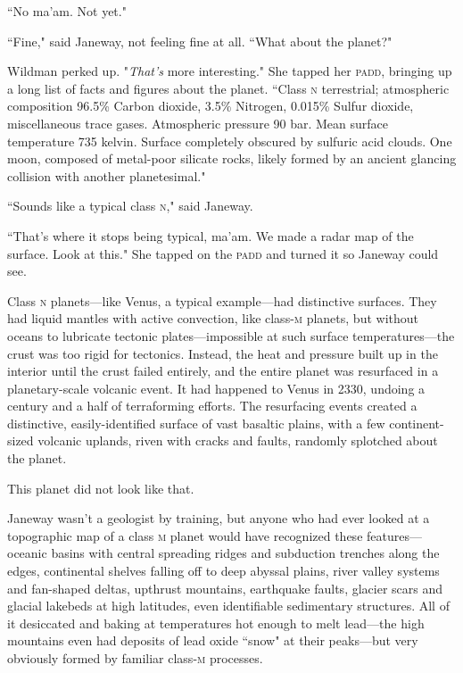 \documentclass[twoside,letterpaper,12pt]{memoir}
\begin{document}
``No ma'am. Not yet."

``Fine," said Janeway, not feeling fine at all. ``What about the planet?"

Wildman perked up. "\textit{That's} more interesting." She tapped her \textsc{padd}, bringing up a long list of facts and figures about the planet. ``Class \textsc{n} terrestrial; atmospheric composition 96.5\% Carbon dioxide, 3.5\% Nitrogen, 0.015\% Sulfur dioxide, miscellaneous trace gases. Atmospheric pressure 90 bar. Mean surface temperature 735 kelvin. Surface completely obscured by sulfuric acid clouds. One moon, composed of metal-poor silicate rocks, likely formed by an ancient glancing collision with another planetesimal."

``Sounds like a typical class \textsc{n}," said Janeway.

``That's where it stops being typical, ma'am. We made a radar map of the surface. Look at this." She tapped on the \textsc{padd} and turned it so Janeway could see.

Class \textsc{n} planets---like Venus, a typical example---had distinctive surfaces. They had liquid mantles with active convection, like class-\textsc{m} planets, but without oceans to lubricate tectonic plates---impossible at such surface temperatures---the crust was too rigid for tectonics. Instead, the heat and pressure built up in the interior until the crust failed entirely, and the entire planet was resurfaced in a planetary-scale volcanic event. It had happened to Venus in 2330, undoing a century and a half of terraforming efforts. The resurfacing events created a distinctive, easily-identified surface of vast basaltic plains, with a few continent-sized volcanic uplands, riven with cracks and faults, randomly splotched about the planet.

This planet did not look like that.

Janeway wasn't a geologist by training, but anyone who had ever looked at a topographic map of a class \textsc{m} planet would have recognized these features---oceanic basins with central spreading ridges and subduction trenches along the edges, continental shelves falling off to deep abyssal plains, river valley systems and fan-shaped deltas, upthrust mountains, earthquake faults, glacier scars and glacial lakebeds at high latitudes, even identifiable sedimentary structures. All of it desiccated and baking at temperatures hot enough to melt lead---the high mountains even had deposits of lead oxide ``snow" at their peaks---but very obviously formed by familiar class-\textsc{m} processes.
\end{document}
